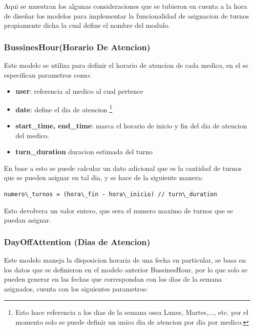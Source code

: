 Aqui se muestran los algunas consideraciones que se tubieron en cuenta a la hora de 
dise\~nar los modelos para implementar la funcionalidad de asignacion de turnos
propiamente dicha la cual define el nombre del modulo. 


\subsubsection{BussinesHour(Horario De Atencion)}

Este modelo se utiliza para definir el horario de atencion de cada medico, en 
el se especifican parametros como:

\begin{itemize}
    \item \textbf{user}: referencia al medico al cual pertence 
    \item \textbf{date}: define el dia de atencion \footnote{Esto hace 
        referencia a los dias de la semana osea Lunes, Martes,..., etc. por el 
        momento solo se puede definir un unico dia de atencion por dia por 
    medico.}
    \item \textbf{start\_time, end\_time}: marca el horario de inicio y fin del 
        dia de atencion del medico.
    \item \textbf{turn\_duration} duracion estimada del turno
\end{itemize}

En base a esto se puede calcular un dato adicional que es la cantidad de turnos
que se pueden asignar en tal dia, y se hace de la siguiente manera:

\begin{lstlisting}
numero\_turnos = (hora\_fin - hora\_inicio) // turn\_duration
\end{lstlisting}

Esto devolvera un valor entero, que sera el numero maximo de turnos que se 
puedan asignar.


\subsubsection{DayOffAttention (Dias de Atencion)}

Este modelo maneja la disposicion horaria de una fecha en particular, se basa 
en los datos que se definieron en el modelo anterior BussinesHour, por lo que 
solo se pueden generar en las fechas que correspondan con los dias de la semana
asignados, cuenta con los siguientes parametros:

